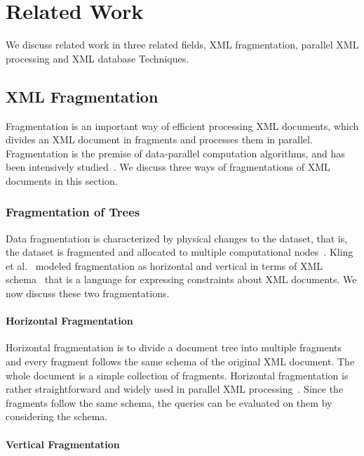
\chapter{Related Work}
\label{sec:relatedwork}

We discuss related work in three related fields, XML fragmentation, parallel XML
processing and XML database Techniques.

\section{XML Fragmentation}

Fragmentation is an important way of efficient processing XML documents, which
divides an XML document in fragments and processes them in parallel.
Fragmentation is the premise of data-parallel computation algorithms, and has
been intensively
studied~\cite{ARBM06,DaGP14,CFKL12,NEMH07,OgTP13,LiZZ17,CFKL12,DaGP14}. We
discuss three ways of fragmentations of XML documents in this section.

\subsection{Fragmentation of Trees}

Data fragmentation is characterized by physical changes to the dataset, that is,
the dataset is fragmented and allocated to multiple computational
nodes~\cite{BrMa14}. Kling et al.~\cite{kling11:dist_xml} modeled fragmentation
as horizontal and vertical in terms of XML schema~\cite{schema} that is a
language for expressing constraints about XML documents. We now discuss these
two fragmentations.

\subsubsection{Horizontal Fragmentation}
\label{sec:hfragment}

Horizontal fragmentation is to divide a document tree into multiple fragments
and every fragment follows the same schema of the original XML document. The
whole document is a simple collection of fragments. Horizontal fragmentation is
rather straightforward and widely used in parallel XML
processing~\cite{DaGP14,BoLS09,AfDG15,CCMN15}. Since the fragments follow the
same schema, the queries can be evaluated on them by considering the schema.

\subsubsection{Vertical Fragmentation}
\label{sec:vfragment}

